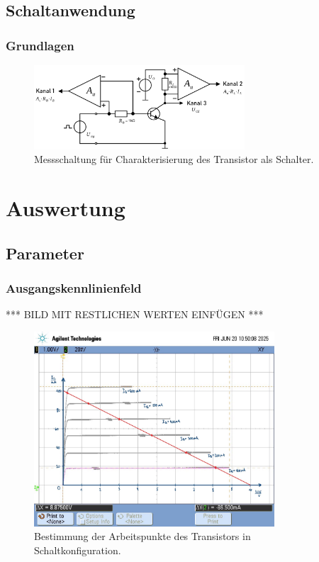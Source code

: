 \documentclass[
	a4paper, %
	12pt, %
]{CSUniSchoolLabReport}
\begin{document}
\subsection{Schaltanwendung}
\subsubsection{Grundlagen}
\begin{figure}[H]
	\centering
	\includegraphics[width=0.7\textwidth]{Figures/MessschaltungSchaltanwendung.png}
	\caption{Messschaltung für Charakterisierung des Transistor als Schalter.}
	\label{fig:MessschaltungSchaltanwendung}
\end{figure}

\section{Auswertung}
\subsection{Parameter}
\subsubsection{Ausgangskennlinienfeld}


\vspace{1em}
*** BILD MIT RESTLICHEN WERTEN EINFÜGEN ***
\begin{figure}[H]
	\centering
	\includegraphics[width=0.8\textwidth]{Figures/scope_4_eingangskennlinie_C.3.1..jpg}
	\caption{Bestimmung der Arbeitspunkte des Transistors in Schaltkonfiguration.}
	\label{fig:arbeitspunkte schaltkonfiguration}
\end{figure}
\end{document}
